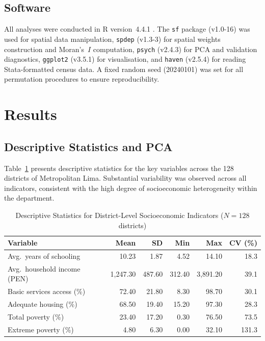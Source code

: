 \documentclass[12pt,a4paper,twoside]{article}
\begin{document}
\subsection{Software}

All analyses were conducted in R version~4.4.1 \citep{rcore2024}. The \texttt{sf}
package (v1.0-16) was used for spatial data manipulation, \texttt{spdep} (v1.3-3)
for spatial weights construction and Moran's~$I$ computation, \texttt{psych}
(v2.4.3) for PCA and validation diagnostics, \texttt{ggplot2} (v3.5.1) for
visualisation, and \texttt{haven} (v2.5.4) for reading Stata-formatted census
data. A fixed random seed (20240101) was set for all permutation procedures to
ensure reproducibility.

\section{Results}

\subsection{Descriptive Statistics and PCA}

Table~\ref{tab:descriptives} presents descriptive statistics for the key variables
across the 128 districts of Metropolitan Lima. Substantial variability was observed
across all indicators, consistent with the high degree of socioeconomic heterogeneity
within the department.

\begin{table}[htbp]
  \centering
  \caption{Descriptive Statistics for District-Level Socioeconomic Indicators
           ($N = 128$ districts)}
  \label{tab:descriptives}
  \begin{tabular}{lrrrrr}
    \toprule
    Variable & Mean & SD & Min & Max & CV (\%) \\
    \midrule
    Avg.\ years of schooling & 10.23 & 1.87 & 4.52 & 14.10 & 18.3 \\
    Avg.\ household income (PEN) & 1,247.30 & 487.60 & 312.40 & 3,891.20 & 39.1 \\
    Basic services access (\%) & 72.40 & 21.80 & 8.30 & 98.70 & 30.1 \\
    Adequate housing (\%) & 68.50 & 19.40 & 15.20 & 97.30 & 28.3 \\
    Total poverty (\%) & 23.40 & 17.20 & 0.30 & 76.50 & 73.5 \\
    Extreme poverty (\%) & 4.80 & 6.30 & 0.00 & 32.10 & 131.3 \\
    \bottomrule
  \end{tabular}
\end{table}
\end{document}
